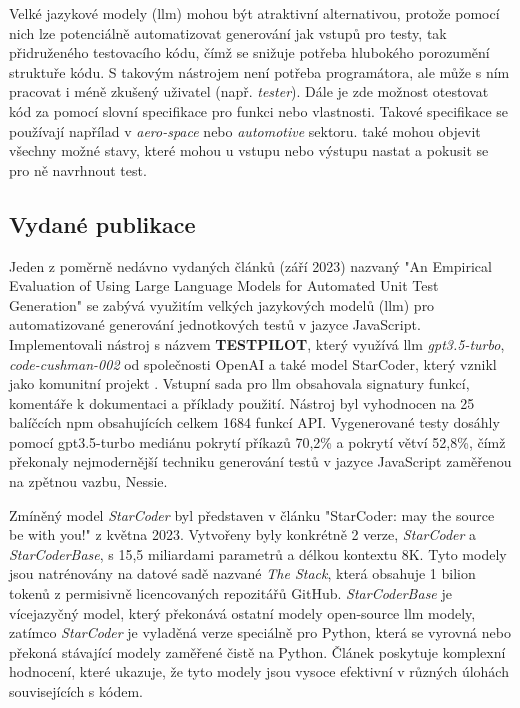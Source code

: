 \documentclass[czech, ma, kiv, he, iso690alph, pdf, viewonly]{fasthesis}
\begin{document}
        Velké jazykové modely (\gls{llm}) mohou být atraktivní alternativou, protože pomocí nich lze potenciálně automatizovat generování jak vstupů pro testy, tak přidruženého testovacího kódu, čímž se snižuje potřeba hlubokého porozumění struktuře kódu. S takovým nástrojem není potřeba programátora, ale může s ním pracovat i méně zkušený uživatel (např. \textit{tester}). Dále je zde možnost otestovat kód za pomocí slovní specifikace pro funkci nebo vlastnosti. Takové specifikace se používají napřílad v \textit{aero-space} nebo \textit{automotive} sektoru.  také mohou objevit všechny možné stavy, které mohou u vstupu nebo výstupu nastat a pokusit se pro ně navrhnout test.

    \subsection{Vydané publikace}
    Jeden z poměrně nedávno vydaných článků (září 2023) nazvaný "An Empirical Evaluation of Using Large Language Models for Automated Unit Test Generation" \cite{schafer2023empirical} se zabývá využitím velkých jazykových modelů (\gls{llm}) pro automatizované generování jednotkových testů v jazyce JavaScript. Implementovali nástroj s názvem \textbf{TESTPILOT}, který využívá \gls{llm} \textit{gpt3.5-turbo}, \textit{code-cushman-002} od společnosti OpenAI a  také model StarCoder, který vznikl jako komunitní projekt \cite{StarCoder2023}. Vstupní sada pro \gls{llm} obsahovala signatury funkcí, komentáře k dokumentaci a příklady použití. Nástroj byl vyhodnocen na 25 balíčcích npm obsahujících celkem 1684 funkcí API. Vygenerované testy dosáhly pomocí gpt3.5-turbo mediánu pokrytí příkazů 70,2\% a pokrytí větví 52,8\%, čímž překonaly nejmodernější techniku generování testů v jazyce JavaScript zaměřenou na zpětnou vazbu, Nessie.

    Zmíněný model \emph{StarCoder} byl představen v článku "StarCoder: may the source be with you!" \cite{StarCoder2023} z května 2023. Vytvořeny byly konkrétně 2 verze, \textit{StarCoder} a \textit{StarCoderBase}, s 15,5 miliardami parametrů a délkou kontextu 8K. Tyto modely jsou natrénovány na datové sadě nazvané \textit{The Stack}, která obsahuje 1 bilion tokenů z permisivně licencovaných repozitářů GitHub. \textit{StarCoderBase} je vícejazyčný model, který překonává ostatní modely open-source \gls{llm} modely, zatímco \textit{StarCoder} je vyladěná verze speciálně pro Python, která se vyrovná nebo překoná stávající modely zaměřené čistě na Python. Článek poskytuje komplexní hodnocení, které ukazuje, že tyto modely jsou vysoce efektivní v různých úlohách souvisejících s kódem.
\end{document}
